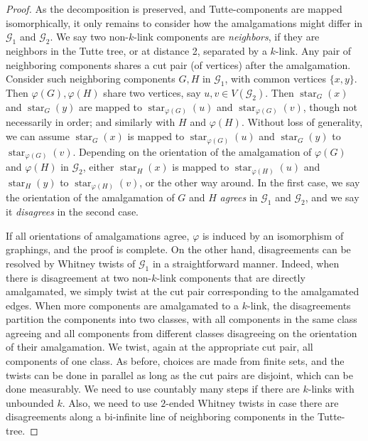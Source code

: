 \documentclass{article}
\theoremstyle{plain}
\theoremstyle{definition}
\newcommand{\cG}{\mathcal{G}}
\begin{document}
\begin{proof}
    As the decomposition is preserved, and Tutte-components are mapped isomorphically, it only remains to consider how the amalgamations might differ in $\cG_1$ and $\cG_2$. We say two non-$k$-link components are \emph{neighbors}, if they are neighbors in the Tutte tree, or at distance 2, separated by a $k$-link. Any pair of neighboring components shares a cut pair (of vertices) after the amalgamation. Consider such neighboring components $G,H$ in $\cG_1$, with common vertices $\{x,y\}$. Then $\varphi(G), \varphi(H)$ share two vertices, say $u, v \in V(\cG_2)$. Then $\operatorname{star}_{G}(x)$ and $\operatorname{star}_{G}(y)$ are mapped to $\operatorname{star}_{\varphi(G)}(u)$ and $\operatorname{star}_{\varphi(G)}(v)$, though not necessarily in order; and similarly with $H$ and $\varphi(H)$. Without loss of generality, we can assume $\operatorname{star}_{G}(x)$ is mapped to $\operatorname{star}_{\varphi(G)}(u)$ and $\operatorname{star}_{G}(y)$ to $\operatorname{star}_{\varphi(G)}(v)$. Depending on the orientation of the amalgamation of $\varphi(G)$ and $\varphi(H)$ in $\cG_2$, either $\operatorname{star}_{H}(x)$ is mapped to $\operatorname{star}_{\varphi(H)}(u)$ and $\operatorname{star}_{H}(y)$ to $\operatorname{star}_{\varphi(H)}(v)$, or the other way around. In the first case, we say the orientation of the amalgamation of $G$ and $H$ \emph{agrees} in $\cG_1$ and $\cG_2$, and we say it \emph{disagrees} in the second case. 

    If all orientations of amalgamations agree, $\varphi$ is induced by an isomorphism of graphings, and the proof is complete. On the other hand, disagreements can be resolved by Whitney twists of $\cG_1$ in a straightforward manner. Indeed, when there is disagreement at two non-$k$-link components that are directly amalgamated, we simply twist at the cut pair corresponding to the amalgamated edges. When more components are amalgamated to a $k$-link, the disagreements partition the components into two classes, with all components in the same class agreeing and all components from different classes disagreeing on the orientation of their amalgamation. We twist, again at the appropriate cut pair, all components of one class. As before, choices are made from finite sets, and the twists can be done in parallel as long as the cut pairs are disjoint, which can be done measurably. We need to use countably many steps if there are $k$-links with unbounded $k$. Also, we need to use $2$-ended Whitney twists in case there are disagreements along a bi-infinite line of neighboring components in the Tutte-tree. 
\end{proof}
\end{document}
